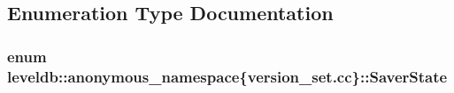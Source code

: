 \subsection{Enumeration Type Documentation}
\hypertarget{namespaceleveldb_1_1anonymous__namespace_02version__set_8cc_03_aa77f56e7bee115a7e23642d102c7e9fb}{}
\subsubsection[{Saver\+State}]{\setlength{\rightskip}{0pt plus 5cm}enum leveldb\+::anonymous\+\_\+namespace\{version\+\_\+set.\+cc\}\+::{\bf Saver\+State}}\label{namespaceleveldb_1_1anonymous__namespace_02version__set_8cc_03_aa77f56e7bee115a7e23642d102c7e9fb}
